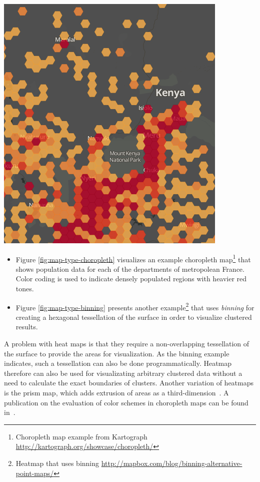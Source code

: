 \begin{itemize}
{    \includegraphics [width=\linewidth]{figures/map_types_heatmap.png}
    \label{fig:map-type-binning}
}


\begin{itemize}

\item Figure \ref{fig:map-type-choropleth} visualizes an example choropleth map\footnote{Choropleth map example from Kartograph \url{http://kartograph.org/showcase/choropleth/}} that shows population data for each of the departments of metropolean France. Color coding is used to indicate densely populated regions with heavier red tones.

\item Figure \ref{fig:map-type-binning} presents another example\footnote{Heatmap that uses binning \url{http://mapbox.com/blog/binning-alternative-point-maps/}} that uses \textit{binning} for creating a hexagonal tessellation of the surface in order to visualize clustered results. 

\end {itemize}

A problem with heat maps is that they require a non-overlapping tessellation of the surface to provide the areas for visualization. As the binning example indicates, such a tessellation can also be done programmatically. Heatmap therefore can also be used for visualizating arbitrary clustered data without a need to calculate the exact boundaries of clusters. Another variation of heatmaps is the prism map, which adds extrusion of areas as a third-dimension~\cite{ladenhauf12dia, Delort10vis}. A publication on the evaluation of color schemes in choropleth maps can be found in~\cite{MacEachrenMort}. 



\end{itemize}
